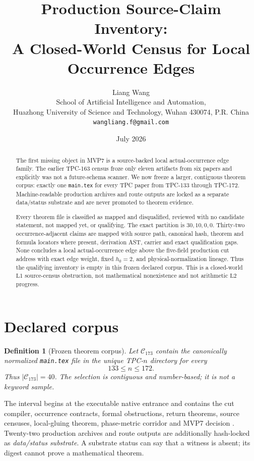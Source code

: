 \documentclass[11pt]{article}
\title{\textbf{Production Source-Claim Inventory:}\\
\textbf{A Closed-World Census for Local Occurrence Edges}}
\author{Liang Wang\\
School of Artificial Intelligence and Automation,\\
Huazhong University of Science and Technology, Wuhan 430074, P.R. China\\
\texttt{wangliang.f@gmail.com}}
\date{July 2026}
\newtheorem{definition}[theorem]{Definition}
\newcommand{\Lone}{\mathrm{L1}}
\newcommand{\Ltwo}{\mathrm{L2}}
\begin{document}
\maketitle

\begin{abstract}
The first missing object in MVP7 is a source-backed local
actual-occurrence edge family.  The earlier TPC-163 census froze only
eleven artifacts from six papers and explicitly was not a future-schema
scanner.  We now freeze a larger, contiguous theorem corpus: exactly one
\texttt{main.tex} for every TPC paper from TPC-133 through TPC-172.
Machine-readable production archives and route outputs are locked as a
separate data/status substrate and are never promoted to theorem evidence.

Every theorem file is classified as mapped and disqualified, reviewed with
no candidate statement, not mapped yet, or qualifying.  The exact partition
is \(30,10,0,0\).  Thirty-two occurrence-adjacent claims are mapped with
source path, canonical hash, theorem and formula locators where present,
derivation AST, carrier and exact qualification gaps.  None concludes a
local actual-occurrence edge above the five-field production cut address
with exact edge weight, fixed \(h_0=2\), and physical-normalization lineage.
Thus the qualifying inventory is empty in this frozen declared corpus.
This is a closed-world \(\Lone\) source-census obstruction, not mathematical
nonexistence and not arithmetic \(\Ltwo\) progress.
\end{abstract}

\section{Declared corpus}

\begin{definition}[Frozen theorem corpus]\label{def:corpus}
Let \(\mathcal C_{173}\) contain the canonically normalized
\texttt{main.tex} file in the unique TPC-\(n\) directory for every
\[
 133\le n\le172.
\]
Thus \(|\mathcal C_{173}|=40\).  The selection is contiguous and
number-based; it is not a keyword sample.
\end{definition}

The interval begins at the executable native entrance and contains the
cut compiler, occurrence contracts, formal obstructions, return theorems,
source censuses, local-gluing theorem, phase-metric corridor and MVP7
decision \citep{WangTPC163,WangTPC166,WangTPC172}.  Twenty-two production
archives and route outputs are additionally hash-locked as
\emph{data/status substrate}.  A substrate status can say that a witness is
absent; its digest cannot prove a mathematical theorem.
\end{document}
